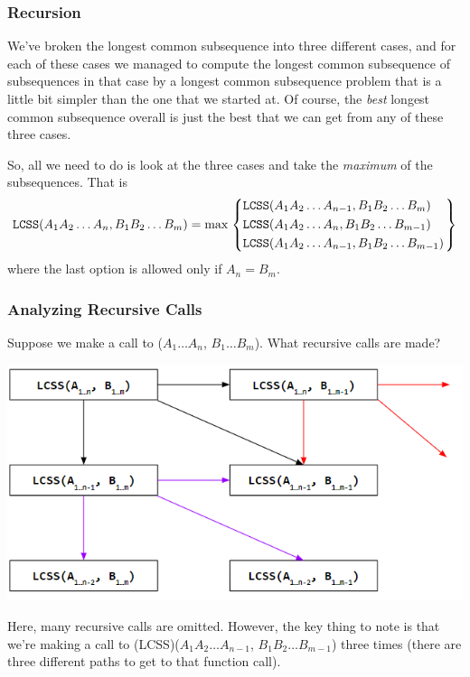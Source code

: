 \documentclass[letterpaper]{article}
\begin{document}
\subsubsection{Recursion}
We've broken the longest common subsequence into three different cases, and for each of these cases we managed to compute the longest common subsequence of subsequences in that case by a longest common subsequence problem that is a little bit simpler than the one that we started at. Of course, the \emph{best} longest common subsequence overall is just the best that we can get from any of these three cases. 

\bigskip 

So, all we need to do is look at the three cases and take the \emph{maximum} of the subsequences. That is
\[\texttt{LCSS}(A_1 A_2 \dots A_n, B_1 B_2 \dots B_m) = \max \begin{rcases}
    \begin{dcases}
        \texttt{LCSS}(A_1 A_2 \dots A_{n - 1}, B_1 B_2 \dots B_m) \\ 
        \texttt{LCSS}(A_1 A_2 \dots A_n, B_1 B_2 \dots B_{m - 1}) \\ 
        \texttt{LCSS}(A_1 A_2 \dots A_{n - 1}, B_1 B_2 \dots B_{m - 1})
    \end{dcases}
\end{rcases}\]
where the last option is allowed only if $A_n = B_m$. 

\subsubsection{Analyzing Recursive Calls}
Suppose we make a call to ($A_1 \dots A_n$, $B_1 \dots B_m$). What recursive calls are made? 
\begin{center}
    \includegraphics[scale=0.9]{assets/lcss_1.png}
\end{center}
Here, many recursive calls are omitted. However, the key thing to note is that we're making a call to \code(LCSS)($A_1 A_2 \dots A_{n - 1}$, $B_1 B_2 \dots B_{m - 1}$) three times (there are three different paths to get to that function call). 
\end{document}
